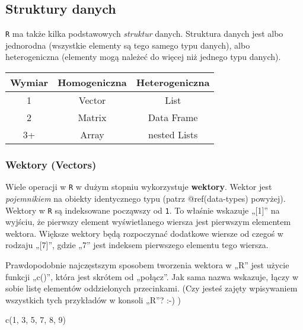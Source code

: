 \documentclass[
]{article}
\newenvironment{Shaded}{\begin{snugshade}}{\end{snugshade}}
\newcommand{\DecValTok}[1]{\textcolor[rgb]{0.00,0.00,0.81}{#1}}
\newcommand{\FunctionTok}[1]{\textcolor[rgb]{0.00,0.00,0.00}{#1}}
\newcommand{\NormalTok}[1]{#1}
\begin{document}
\hypertarget{struktury-danych}{%
\subsection{Struktury danych}\label{struktury-danych}}

\texttt{R} ma także kilka podstawowych \emph{struktur} danych. Struktura
danych jest albo jednorodna (wszystkie elementy są tego samego typu
danych), albo heterogeniczna (elementy mogą należeć do więcej niż
jednego typu danych).

\begin{longtable}[]{@{}ccc@{}}
\toprule
Wymiar & \textbf{Homogeniczna} & \textbf{Heterogeniczna} \\
\midrule
\endhead
1 & Vector & List \\
2 & Matrix & Data Frame \\
3+ & Array & nested Lists \\
\bottomrule
\end{longtable}

\hypertarget{wektory-vectors}{%
\subsubsection{Wektory (Vectors)}\label{wektory-vectors}}

Wiele operacji w \texttt{R} w dużym stopniu wykorzystuje
\textbf{wektory}. Wektor jest \emph{pojemnikiem} na obiekty identycznego
typu (patrz @ref(data-types) powyżej). Wektory w \texttt{R} są
indeksowane począwszy od \texttt{1}. To właśnie wskazuje „{[}1{]}'' na
wyjściu, że pierwszy element wyświetlanego wiersza jest pierwszym
elementem wektora. Większe wektory będą rozpoczynać dodatkowe wiersze od
czegoś w rodzaju „{[}7{]}'', gdzie „7'' jest indeksem pierwszego
elementu tego wiersza.

Prawdopodobnie najczęstszym sposobem tworzenia wektora w „R'' jest
użycie funkcji „c()'', która jest skrótem od „połącz''. Jak sama nazwa
wskazuje, łączy w sobie listę elementów oddzielonych przecinkami. (Czy
jesteś zajęty wpisywaniem wszystkich tych przykładów w konsoli „R''? :-)
)

\begin{Shaded}
\begin{Highlighting}[]
\FunctionTok{c}\NormalTok{(}\DecValTok{1}\NormalTok{, }\DecValTok{3}\NormalTok{, }\DecValTok{5}\NormalTok{, }\DecValTok{7}\NormalTok{, }\DecValTok{8}\NormalTok{, }\DecValTok{9}\NormalTok{)}
\end{Highlighting}
\end{Shaded}
\end{document}

